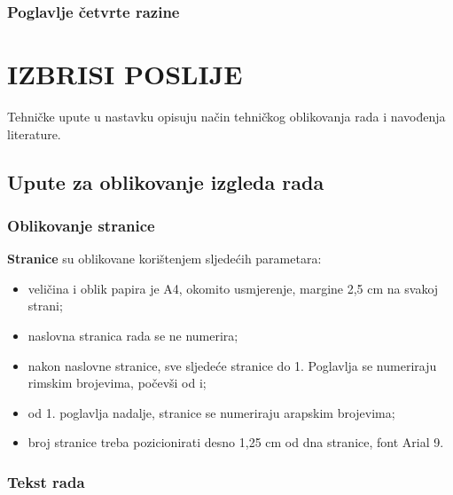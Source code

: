 \documentclass[]{foi}
\begin{document}
\lipsum[2]



\subsection{Poglavlje četvrte razine}

\lipsum[4-5]



\chapter{IZBRISI POSLIJE}

Tehničke upute u nastavku opisuju način tehničkog oblikovanja rada i navođenja literature.



\section{Upute za oblikovanje izgleda rada}

\subsection{Oblikovanje stranice}

\textbf{Stranice} su oblikovane korištenjem sljedećih parametara:

\begin{itemize}
    \item veličina i oblik papira je A4, okomito usmjerenje, margine 2,5 cm na svakoj strani;

    \item naslovna stranica rada se ne numerira;

    \item nakon naslovne stranice, sve sljedeće stranice do 1. Poglavlja se numeriraju rimskim brojevima, počevši od i;

    \item od 1. poglavlja nadalje, stranice se numeriraju arapskim brojevima;

    \item broj stranice treba pozicionirati desno 1,25 cm od dna stranice, font Arial 9.
\end{itemize}

\subsection{Tekst rada}
\end{document}
